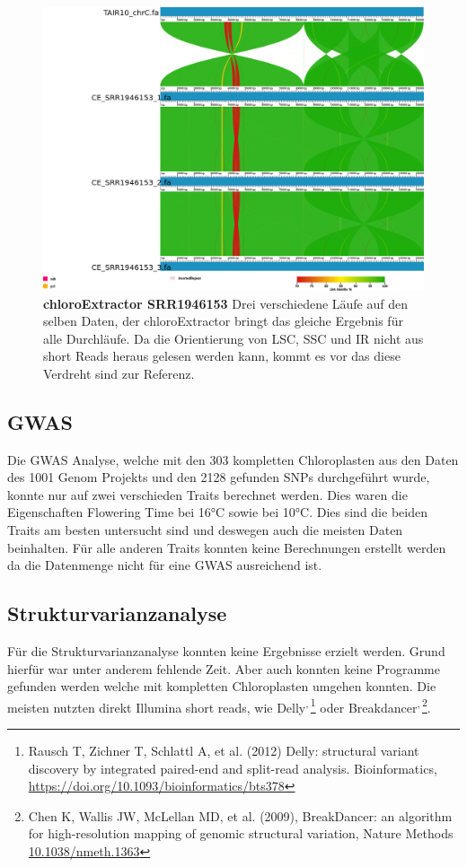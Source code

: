 \documentclass{scrartcl}
\begin{document}
\begin{figure}
\includegraphics[width=.9\linewidth]{./SRR1946153_CE_1.png}
\caption[chloroExtractor SRR1946153]{\textbf{chloroExtractor SRR1946153} Drei verschiedene Läufe auf den selben Daten, der chloroExtractor bringt das gleiche Ergebnis für alle Durchläufe. Da die Orientierung von LSC, SSC und IR nicht aus short Reads heraus gelesen werden kann, kommt es vor das diese Verdreht sind zur Referenz.}
\end{figure}
\subsection{GWAS}
\label{sec-4-8}
Die GWAS Analyse, welche mit den 303 kompletten Chloroplasten aus den Daten des 1001 Genom Projekts und den 2128 gefunden SNPs durchgeführt wurde, konnte nur auf zwei verschieden Traits berechnet werden. Dies waren 
die Eigenschaften Flowering Time bei 16°C sowie bei 10°C. Dies sind die beiden Traits am besten untersucht sind und deswegen auch die meisten Daten beinhalten. Für alle anderen Traits konnten
keine Berechnungen erstellt werden da die Datenmenge nicht für eine GWAS ausreichend ist. 
\subsection{Strukturvarianzanalyse}
\label{sec-4-9}
Für die Strukturvarianzanalyse konnten keine Ergebnisse erzielt werden. Grund hierfür war unter anderem fehlende Zeit. Aber auch konnten keine Programme gefunden werden welche mit kompletten Chloroplasten
umgehen konnten. Die meisten nutzten direkt Illumina short reads, wie Delly\footnotemark[65]{}\textsuperscript{,}\,\footnote{Rausch T, Zichner T, Schlattl A, et al. (2012) Delly: structural variant discovery by integrated paired-end and split-read analysis. Bioinformatics, \url{https://doi.org/10.1093/bioinformatics/bts378}} oder Breakdancer\footnotemark[66]{}\textsuperscript{,}\,\footnote{Chen K, Wallis JW, McLellan MD, et al. (2009), BreakDancer: an algorithm for high-resolution mapping of genomic structural variation, Nature Methods \url{10.1038/nmeth.1363}}. 
\end{document}

